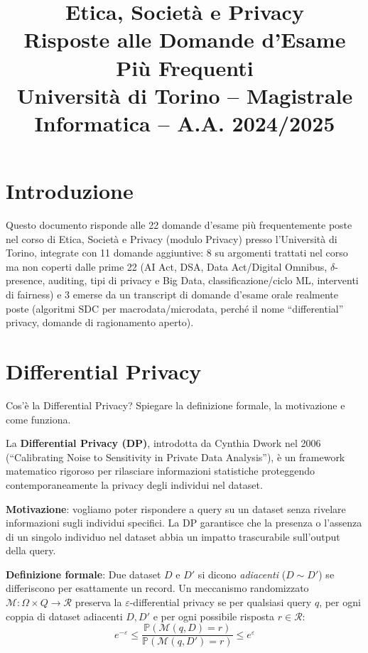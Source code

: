 \documentclass[a4paper,11pt]{article}
\title{\textbf{Etica, Societ\`{a} e Privacy}\\[0.5em]
\large Risposte alle Domande d'Esame Pi\`{u} Frequenti\\[0.3em]
\normalsize Universit\`{a} di Torino -- Magistrale Informatica -- A.A. 2024/2025}
\author{}
\date{}
\begin{document}
\maketitle
\tableofcontents
\newpage

\section*{Introduzione}
Questo documento risponde alle 22 domande d'esame pi\`{u} frequentemente poste nel corso di Etica, Societ\`{a} e Privacy (modulo Privacy) presso l'Universit\`{a} di Torino, integrate con 11 domande aggiuntive: 8 su argomenti trattati nel corso ma non coperti dalle prime 22 (AI Act, DSA, Data Act/Digital Omnibus, $\delta$-presence, auditing, tipi di privacy e Big Data, classificazione/ciclo ML, interventi di fairness) e 3 emerse da un transcript di domande d'esame orale realmente poste (algoritmi SDC per macrodata/microdata, perch\'{e} il nome ``differential'' privacy, domande di ragionamento aperto).

\newpage

\section{Differential Privacy}

\begin{domanda}
Cos'\`{e} la Differential Privacy? Spiegare la definizione formale, la motivazione e come funziona.
\end{domanda}

La \textbf{Differential Privacy (DP)}, introdotta da Cynthia Dwork nel 2006 (``Calibrating Noise to Sensitivity in Private Data Analysis''), \`{e} un framework matematico rigoroso per rilasciare informazioni statistiche proteggendo contemporaneamente la privacy degli individui nel dataset.

\textbf{Motivazione}: vogliamo poter rispondere a query su un dataset senza rivelare informazioni sugli individui specifici. La DP garantisce che la presenza o l'assenza di un singolo individuo nel dataset abbia un impatto trascurabile sull'output della query.

\textbf{Definizione formale}: Due dataset $D$ e $D'$ si dicono \emph{adiacenti} ($D \sim D'$) se differiscono per esattamente un record. Un meccanismo randomizzato $\mathcal{M}: \Omega \times Q \to \mathcal{R}$ preserva la $\varepsilon$-differential privacy se per qualsiasi query $q$, per ogni coppia di dataset adiacenti $D, D'$ e per ogni possibile risposta $r \in \mathcal{R}$:
\[
e^{-\varepsilon} \leq \frac{\mathbb{P}(\mathcal{M}(q, D) = r)}{\mathbb{P}(\mathcal{M}(q, D') = r)} \leq e^{\varepsilon}
\]
\end{document}
